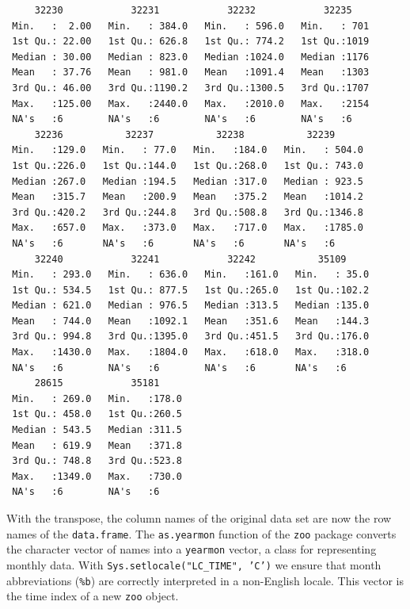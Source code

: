 \documentclass[smallroyalvopaper]{memoir}
\begin{document}
\begin{verbatim}
     32230            32231            32232            32235     
 Min.   :  2.00   Min.   : 384.0   Min.   : 596.0   Min.   : 701  
 1st Qu.: 22.00   1st Qu.: 626.8   1st Qu.: 774.2   1st Qu.:1019  
 Median : 30.00   Median : 823.0   Median :1024.0   Median :1176  
 Mean   : 37.76   Mean   : 981.0   Mean   :1091.4   Mean   :1303  
 3rd Qu.: 46.00   3rd Qu.:1190.2   3rd Qu.:1300.5   3rd Qu.:1707  
 Max.   :125.00   Max.   :2440.0   Max.   :2010.0   Max.   :2154  
 NA's   :6        NA's   :6        NA's   :6        NA's   :6     
     32236           32237           32238           32239       
 Min.   :129.0   Min.   : 77.0   Min.   :184.0   Min.   : 504.0  
 1st Qu.:226.0   1st Qu.:144.0   1st Qu.:268.0   1st Qu.: 743.0  
 Median :267.0   Median :194.5   Median :317.0   Median : 923.5  
 Mean   :315.7   Mean   :200.9   Mean   :375.2   Mean   :1014.2  
 3rd Qu.:420.2   3rd Qu.:244.8   3rd Qu.:508.8   3rd Qu.:1346.8  
 Max.   :657.0   Max.   :373.0   Max.   :717.0   Max.   :1785.0  
 NA's   :6       NA's   :6       NA's   :6       NA's   :6       
     32240            32241            32242           35109      
 Min.   : 293.0   Min.   : 636.0   Min.   :161.0   Min.   : 35.0  
 1st Qu.: 534.5   1st Qu.: 877.5   1st Qu.:265.0   1st Qu.:102.2  
 Median : 621.0   Median : 976.5   Median :313.5   Median :135.0  
 Mean   : 744.0   Mean   :1092.1   Mean   :351.6   Mean   :144.3  
 3rd Qu.: 994.8   3rd Qu.:1395.0   3rd Qu.:451.5   3rd Qu.:176.0  
 Max.   :1430.0   Max.   :1804.0   Max.   :618.0   Max.   :318.0  
 NA's   :6        NA's   :6        NA's   :6       NA's   :6      
     28615            35181      
 Min.   : 269.0   Min.   :178.0  
 1st Qu.: 458.0   1st Qu.:260.5  
 Median : 543.5   Median :311.5  
 Mean   : 619.9   Mean   :371.8  
 3rd Qu.: 748.8   3rd Qu.:523.8  
 Max.   :1349.0   Max.   :730.0  
 NA's   :6        NA's   :6
\end{verbatim}

With the transpose, the column names of the original data set are
now the row names of the \texttt{data.frame}. The \texttt{as.yearmon} function
of the \texttt{zoo} package converts the character vector of names into a
\texttt{yearmon} vector, a class for representing monthly data. With
\texttt{Sys.setlocale("LC\_TIME", 'C')} we ensure that month abbreviations
(\texttt{\%b}) are correctly interpreted in a non-English locale. This
vector is the time index of a new \texttt{zoo} object. 

\end{document}
